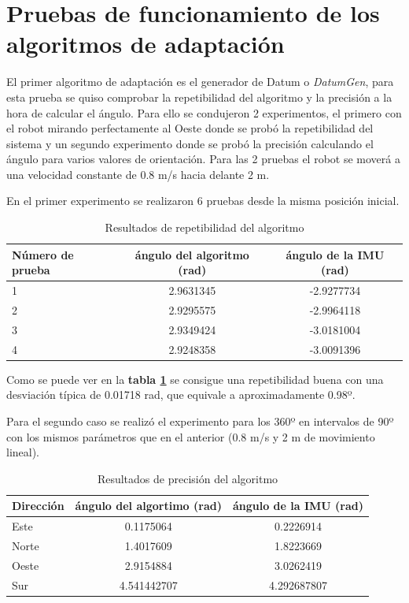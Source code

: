 \section{Pruebas de funcionamiento de los algoritmos de adaptación}
El primer algoritmo de adaptación es el generador de Datum o \textit{DatumGen}, para esta prueba se quiso comprobar la repetibilidad del algoritmo y 
la precisión a la hora de calcular el ángulo. Para ello se condujeron 2 experimentos, el primero con el robot mirando perfectamente al Oeste donde se probó la 
repetibilidad del sistema y un segundo experimento donde se probó la precisión calculando el ángulo para varios valores de orientación. Para las 2 pruebas 
el robot se moverá a una velocidad constante de 0.8 m/s hacia delante 2 m.

En el primer experimento se realizaron 6 pruebas desde la misma posición inicial.
\begin{table}[H]
    \centering
    \caption{Resultados de repetibilidad del algoritmo}
    \begin{tabular}{|l|c|c|}
        \hline
        Número de prueba     & ángulo del algoritmo (rad) & ángulo de la IMU (rad)     \\ \hline
        1           & 2.9631345 & -2.9277734 \\ \hline
        2           & 2.9295575 & -2.9964118  \\ \hline
        3           & 2.9349424 & -3.0181004  \\ \hline
        4           & 2.9248358 & -3.0091396  \\ \hline
    \end{tabular}
    \label{tab:repetibilidad_datumgen}
\end{table}

Como se puede ver en la \textbf{tabla \ref{tab:repetibilidad_datumgen}} se consigue una repetibilidad buena con una desviación 
típica de 0.01718 rad, que equivale a aproximadamente 0.98º.

Para el segundo caso se realizó el experimento para los 360º en intervalos de 90º con los mismos parámetros que en el anterior (0.8 m/s y 2 m de movimiento lineal).

\begin{table}[H]
    \centering
    \caption{Resultados de precisión del algoritmo}
    \begin{tabular}{|l|c|c|}
        \hline
        Dirección     & ángulo del algortimo (rad) & ángulo de la IMU (rad)     \\ \hline
        Este            & 0.1175064 & 0.2226914 \\ \hline
        Norte           & 1.4017609 & 1.8223669  \\ \hline
        Oeste           & 2.9154884 & 3.0262419  \\ \hline
        Sur             & 4.541442707 & 4.292687807 \\ \hline
    \end{tabular}
    \label{tab:precisión_datumgen}
\end{table}


